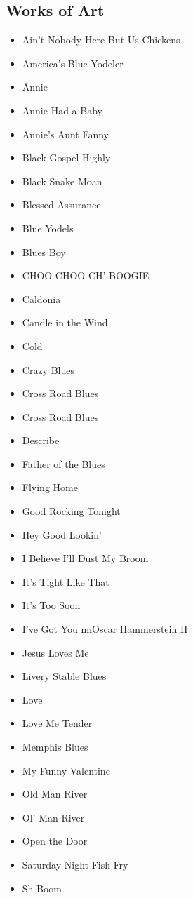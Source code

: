 \documentclass[12pt,a4paper]{article}
\begin{document}
\subsection{Works of Art}
\begin{itemize}
  \item Ain't Nobody Here But Us Chickens
  \item America's Blue Yodeler
  \item Annie
  \item Annie Had a Baby
  \item Annie's Aunt Fanny
  \item Black Gospel Highly
  \item Black Snake Moan
  \item Blessed Assurance
  \item Blue Yodels
  \item Blues Boy
  \item CHOO CHOO CH' BOOGIE
  \item Caldonia
  \item Candle in the Wind
  \item Cold
  \item Crazy Blues
  \item Cross Road Blues
  \item Cross Road Blues
  \item Describe
  \item Father of the Blues
  \item Flying Home
  \item Good Rocking Tonight
  \item Hey Good Lookin'
  \item I Believe I'll Dust My Broom
  \item It's Tight Like That
  \item It's Too Soon
  \item I've Got You nnOscar Hammerstein II
  \item Jesus Loves Me
  \item Livery Stable Blues
  \item Love
  \item Love Me Tender
  \item Memphis Blues
  \item My Funny Valentine
  \item Old Man River
  \item Ol' Man River
  \item Open the Door
  \item Saturday Night Fish Fry
  \item Sh-Boom

\end{itemize}
\end{document}
